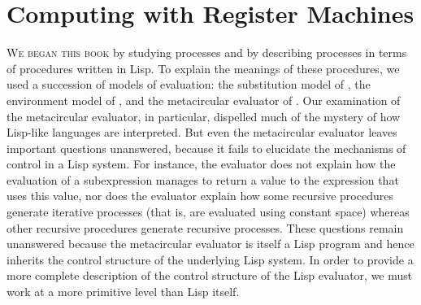 \chapter{Computing with Register Machines}
\label{Chapter 5}



\vspace{2em}


\noindent
\lettrine[findent=1pt]{W}{e began this book} by studying processes and by describing processes in terms of procedures written in Lisp.
To explain the meanings of these procedures, we used a succession of models of evaluation:
the substitution model of , the environment model of , and the metacircular evaluator of .
Our examination of the metacircular evaluator, in particular, dispelled much of the mystery of how Lisp-like languages are interpreted.
But even the metacircular evaluator leaves important questions unanswered, because it fails to elucidate the mechanisms of control in a Lisp system.
For instance, the evaluator does not explain how the evaluation of a subexpression manages to return a value to the expression that uses this value, nor does the evaluator explain how some recursive procedures generate iterative processes (that is, are evaluated using constant space) whereas other recursive procedures generate recursive processes.
These questions remain unanswered because the metacircular evaluator is itself a Lisp program and hence inherits the control structure of the underlying Lisp system.
In order to provide a more complete description of the control structure of the Lisp evaluator, we must work at a more primitive level than Lisp itself.

